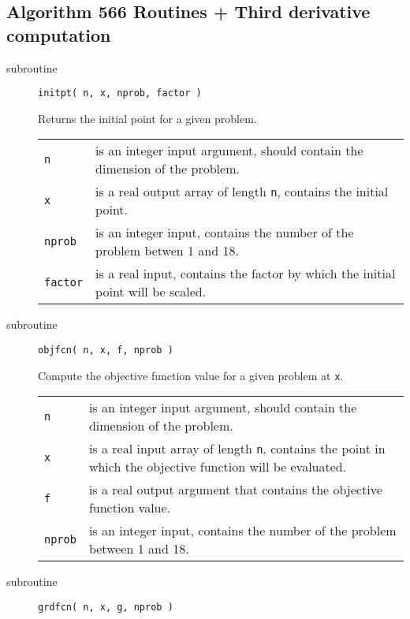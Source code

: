 \documentclass[11pt]{article}
\begin{document}
\subsection{Algorithm 566 Routines + Third derivative computation}
\label{sec:or}

\begin{description}

\item[subroutine] \verb|initpt( n, x, nprob, factor )|

  Returns the initial point for a given problem.

  \begin{longtable}{p{1cm} p{13.4cm}}
    \verb|n| & is an integer input argument, should contain the
    dimension of the problem. \\[1ex]
	 
    \verb|x| & is a real output array of length \verb|n|, contains the
    initial point. \\[1ex]
 
    \verb|nprob| & is an integer input, contains the number of the
    problem betwen 1 and 18. \\[1ex]
 
    \verb|factor| & is a real input, contains the factor by which the
    initial point will be scaled.
  \end{longtable}

\item[subroutine] \verb|objfcn( n, x, f, nprob )|

  Compute the objective function value for a given problem at
  \verb|x|.

  \begin{longtable}{p{1cm} p{13.4cm}}
    \verb|n| & is an integer input argument, should contain the
    dimension of the problem. \\[1ex]

    \verb|x| & is a real input array of length \verb|n|, contains the
    point in which the objective function will be evaluated. \\[1ex]

    \verb|f| & is a real output argument that contains the objective
    function value. \\[1ex]

    \verb|nprob| & is an integer input, contains the number of the
    problem between 1 and 18.
  \end{longtable}

\item[subroutine] \verb|grdfcn( n, x, g, nprob )|


\end{description}
\end{document}
